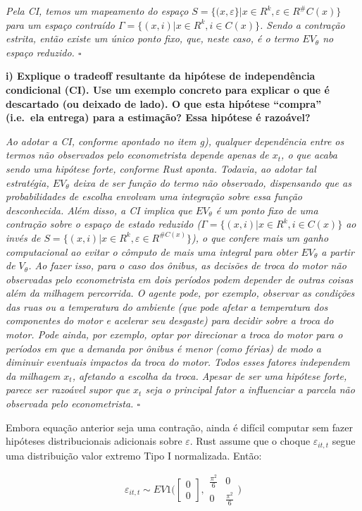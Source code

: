 \documentclass[12pt,a4paper]{article}
\begin{document}
\emph{Pela CI, temos um mapeamento do espaço
\(S=\{(x,\varepsilon\}|x \in R^k, \varepsilon \in R^\#C(x)\}\) para um
espaço contraído \(\Gamma=\{(x,i)|x \in R^k, i \in C(x)\}\). Sendo a
contração estrita, então existe um único ponto fixo, que, neste caso, é
o termo \(EV_\theta\) no espaço reduzido. \(\square\)}

\textbf{i) Explique o tradeoff resultante da hipótese de independência
condicional (CI). Use um exemplo concreto para explicar o que é
descartado (ou deixado de lado). O que esta hipótese ``compra''
(i.e.~ela entrega) para a estimação? Essa hipótese é razoável?}

\emph{Ao adotar a CI, conforme apontado no item g), qualquer dependência
entre os termos não observados pelo econometrista depende apenas de
\(x_t\), o que acaba sendo uma hipótese forte, conforme Rust aponta.
Todavia, ao adotar tal estratégia, \(EV_\theta\) deixa de ser função do
termo não observado, dispensando que as probabilidades de escolha
envolvam uma integração sobre essa função desconhecida. Além disso, a CI
implica que \(EV_\theta\) é um ponto fixo de uma contração sobre o
espaço de estado reduzido (\(\Gamma=\{(x,i)|x\in R^k, i \in C(x)\}\) ao
invés de \(S=\{(x,i)|x\in R^k, \varepsilon \in R^{\#C(x)}\}\)), o que
confere mais um ganho computacional ao evitar o cômputo de mais uma
integral para obter \(EV_\theta\) a partir de \(V_\theta\). Ao fazer
isso, para o caso dos ônibus, as decisões de troca do motor não
observadas pelo econometrista em dois períodos podem depender de outras
coisas além da milhagem percorrida. O agente pode, por exemplo, observar
as condições das ruas ou a temperatura do ambiente (que pode afetar a
temperatura dos componentes do motor e acelerar seu desgaste) para
decidir sobre a troca do motor. Pode ainda, por exemplo, optar por
direcionar a troca do motor para o períodos em que a demanda por ônibus
é menor (como férias) de modo a diminuir eventuais impactos da troca do
motor. Todos esses fatores independem da milhagem \(x_t\), afetando a
escolha da troca. Apesar de ser uma hipótese forte, parece ser razoável
supor que \(x_t\) seja o principal fator a influenciar a parcela não
observada pelo econometrista. \(\square\)}

Embora equação anterior seja uma contração, ainda é difícil computar sem
fazer hipóteses distribucionais adicionais sobre \(\varepsilon\). Rust
assume que o choque \(\varepsilon_{it,t}\) segue uma distribuição valor
extremo Tipo I normalizada. Então:

\[
\varepsilon_{it,t} \sim EV1 \Bigg( \begin{bmatrix} 
0   \\ 0 \end{bmatrix}, \begin{matrix} \frac{\pi^2}{6} & 0 \\ 0 & \frac{\pi^2}{6} \end{matrix} \Bigg) 
\]
\end{document}
